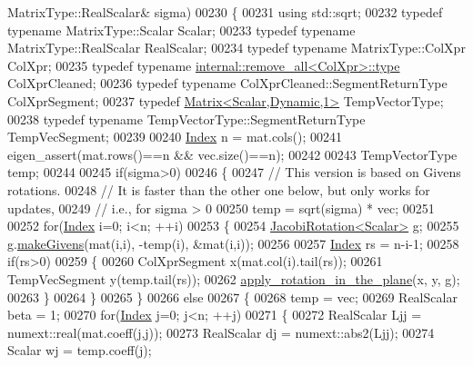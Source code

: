 \begin{DoxyCode}
      MatrixType::RealScalar& sigma)
00230 \{
00231   \textcolor{keyword}{using} std::sqrt;
00232   \textcolor{keyword}{typedef} \textcolor{keyword}{typename} MatrixType::Scalar Scalar;
00233   \textcolor{keyword}{typedef} \textcolor{keyword}{typename} MatrixType::RealScalar RealScalar;
00234   \textcolor{keyword}{typedef} \textcolor{keyword}{typename} MatrixType::ColXpr ColXpr;
00235   \textcolor{keyword}{typedef} \textcolor{keyword}{typename} \hyperlink{group___sparse_core___module}{internal::remove\_all<ColXpr>::type} ColXprCleaned;
00236   \textcolor{keyword}{typedef} \textcolor{keyword}{typename} ColXprCleaned::SegmentReturnType ColXprSegment;
00237   \textcolor{keyword}{typedef} \hyperlink{group___core___module}{Matrix<Scalar,Dynamic,1>} TempVectorType;
00238   \textcolor{keyword}{typedef} \textcolor{keyword}{typename} TempVectorType::SegmentReturnType TempVecSegment;
00239 
00240   \hyperlink{namespace_eigen_a62e77e0933482dafde8fe197d9a2cfde}{Index} n = mat.cols();
00241   eigen\_assert(mat.rows()==n && vec.size()==n);
00242 
00243   TempVectorType temp;
00244 
00245   \textcolor{keywordflow}{if}(sigma>0)
00246   \{
00247     \textcolor{comment}{// This version is based on Givens rotations.}
00248     \textcolor{comment}{// It is faster than the other one below, but only works for updates,}
00249     \textcolor{comment}{// i.e., for sigma > 0}
00250     temp = sqrt(sigma) * vec;
00251 
00252     \textcolor{keywordflow}{for}(\hyperlink{namespace_eigen_a62e77e0933482dafde8fe197d9a2cfde}{Index} i=0; i<n; ++i)
00253     \{
00254       \hyperlink{group___jacobi___module_class_eigen_1_1_jacobi_rotation}{JacobiRotation<Scalar>} g;
00255       g.\hyperlink{group___jacobi___module_af73c81e9cc139b7e0d877ce553b02ec0}{makeGivens}(mat(i,i), -temp(i), &mat(i,i));
00256 
00257       \hyperlink{namespace_eigen_a62e77e0933482dafde8fe197d9a2cfde}{Index} rs = n-i-1;
00258       \textcolor{keywordflow}{if}(rs>0)
00259       \{
00260         ColXprSegment x(mat.col(i).tail(rs));
00261         TempVecSegment y(temp.tail(rs));
00262         \hyperlink{namespace_eigen_1_1internal_a5f7738a5c56c9b9decf94d9728ba7906}{apply\_rotation\_in\_the\_plane}(x, y, g);
00263       \}
00264     \}
00265   \}
00266   \textcolor{keywordflow}{else}
00267   \{
00268     temp = vec;
00269     RealScalar beta = 1;
00270     \textcolor{keywordflow}{for}(\hyperlink{namespace_eigen_a62e77e0933482dafde8fe197d9a2cfde}{Index} j=0; j<n; ++j)
00271     \{
00272       RealScalar Ljj = numext::real(mat.coeff(j,j));
00273       RealScalar dj = numext::abs2(Ljj);
00274       Scalar wj = temp.coeff(j);

\end{DoxyCode}
